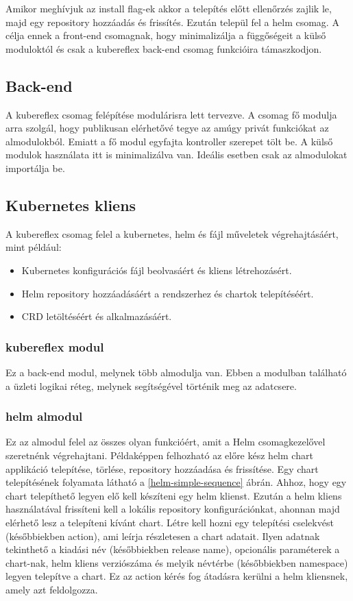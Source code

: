 Amikor meghívjuk az install flag-ek akkor a telepítés előtt ellenőrzés zajlik le, majd egy repository hozzáadás és frissítés.
Ezután települ fel a helm csomag.
A célja ennek a front-end csomagnak, hogy minimalizálja a függőségeit a külső moduloktól és csak a kubereflex back-end csomag funkcióira támaszkodjon.

\subsection{Back-end}
A kubereflex csomag felépítése modulárisra lett tervezve.
A csomag fő modulja arra szolgál, hogy publikusan elérhetővé tegye az amúgy privát funkciókat az almodulokból.
Emiatt a fő modul egyfajta kontroller szerepet tölt be.
A külső modulok használata itt is minimalizálva van. Ideális esetben csak az almodulokat importálja be.

\subsection{Kubernetes kliens}
A kubereflex csomag felel a kubernetes, helm és fájl műveletek végrehajtásáért, mint például:
\begin{itemize}
    \item Kubernetes konfigurációs fájl beolvasáért és kliens létrehozásért.
    \item Helm repository hozzáadásáért a rendszerhez és chartok telepítéséért.
    \item CRD letöltéséért és alkalmazásáért.
\end{itemize}

\subsubsection*{kubereflex modul}
Ez a back-end modul, melynek több almodulja van.
Ebben a modulban található a üzleti logikai réteg, melynek segítségével történik meg az adatcsere.

\subsubsection*{helm almodul}
Ez az almodul felel az összes olyan funkcióért, amit a Helm csomagkezelővel szeretnénk végrehajtani.
Példaképpen felhozható az előre kész helm chart applikáció telepítése, törlése, repository hozzáadása és frissítése.
Egy chart telepítésének folyamata látható a \ref{helm-simple-sequence} ábrán.
Ahhoz, hogy egy chart telepíthető legyen elő kell készíteni egy helm klienst.
Ezután a helm kliens használatával frissíteni kell a lokális repository konfigurációnkat, ahonnan majd elérhető lesz a telepíteni kívánt chart.
Létre kell hozni egy telepítési cselekvést (későbbiekben action), ami leírja részletesen a chart adatait. Ilyen adatnak tekinthető a kiadási név (későbbiekben release name), opcionális paraméterek a chart-nak, helm kliens verziószáma és melyik névtérbe (későbbiekben namespace) legyen telepítve a chart.
Ez az action kérés fog átadásra kerülni a helm kliensnek, amely azt feldolgozza.

